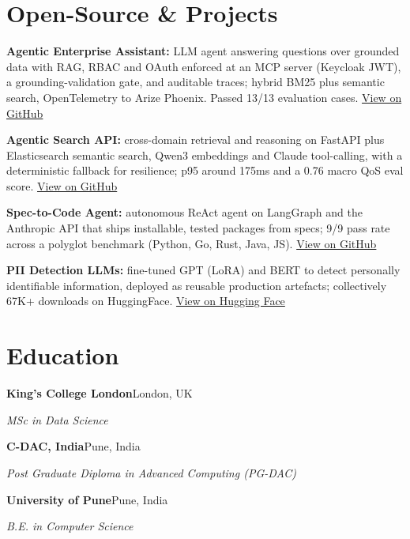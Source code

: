 \documentclass[10pt,a4paper]{article}
\begin{document}
\section{Open-Source \& Projects}
\begin{tight}
  \item \textbf{Agentic Enterprise Assistant:} LLM agent answering questions over grounded data with RAG, RBAC and OAuth enforced at an MCP server (Keycloak JWT), a grounding-validation gate, and auditable traces; hybrid BM25 plus semantic search, OpenTelemetry to Arize Phoenix. Passed 13/13 evaluation cases. \href{https://github.com/abhijeetscode/Agentic-Enterprise-Assistant}{View on GitHub}
  \item \textbf{Agentic Search API:} cross-domain retrieval and reasoning on FastAPI plus Elasticsearch semantic search, Qwen3 embeddings and Claude tool-calling, with a deterministic fallback for resilience; p95 around 175ms and a 0.76 macro QoS eval score. \href{https://github.com/abhijeetscode/search-agent}{View on GitHub}
  \item \textbf{Spec-to-Code Agent:} autonomous ReAct agent on LangGraph and the Anthropic API that ships installable, tested packages from specs; 9/9 pass rate across a polyglot benchmark (Python, Go, Rust, Java, JS). \href{https://github.com/abhijeetscode/Spec-to-Code-Agent}{View on GitHub}
  \item \textbf{PII Detection LLMs:} fine-tuned GPT (LoRA) and BERT to detect personally identifiable information, deployed as reusable production artefacts; collectively 67K+ downloads on HuggingFace. \href{https://huggingface.co/ab-ai/pii_model}{View on Hugging Face}
\end{tight}

\section{Education}
{\color{company}\bfseries King's College London}\hfill {\color{muted}London, UK}\par
{\itshape MSc in Data Science}\par\vspace{2pt}
{\color{company}\bfseries C-DAC, India}\hfill {\color{muted}Pune, India}\par
{\itshape Post Graduate Diploma in Advanced Computing (PG-DAC)}\par\vspace{2pt}
{\color{company}\bfseries University of Pune}\hfill {\color{muted}Pune, India}\par
{\itshape B.E. in Computer Science}\par
\end{document}
